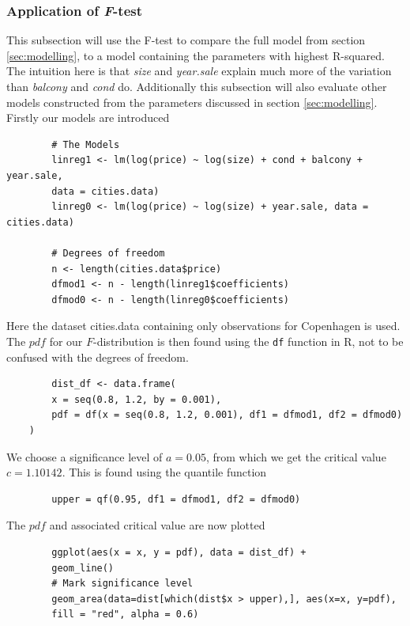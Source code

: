 \subsubsection{Application of \textit{F}-test}\label{sec:app_F_test}
    This subsection will use the F-test to compare the full model from section \ref{sec:modelling}, to a model containing the parameters with highest R-squared. 
    The intuition here is that \textit{size} and \textit{year.sale} explain much more of the variation than \textit{balcony} and \textit{cond} do.
    Additionally this subsection will also evaluate other models constructed from the parameters discussed in section \ref{sec:modelling}.
    Firstly our models are introduced
    \begin{lstlisting}
        # The Models
        linreg1 <- lm(log(price) ~ log(size) + cond + balcony + year.sale, 
        data = cities.data)
        linreg0 <- lm(log(price) ~ log(size) + year.sale, data = cities.data)
        
        # Degrees of freedom
        n <- length(cities.data$price)
        dfmod1 <- n - length(linreg1$coefficients)
        dfmod0 <- n - length(linreg0$coefficients)
    \end{lstlisting}
    Here the dataset cities.data containing only observations for Copenhagen is used.
    The $pdf$ for our $F$-distribution is then found using the \texttt{df} function in R, not to be confused with the degrees of freedom. 
    
    \begin{lstlisting}
        dist_df <- data.frame(
        x = seq(0.8, 1.2, by = 0.001),
        pdf = df(x = seq(0.8, 1.2, 0.001), df1 = dfmod1, df2 = dfmod0)
    )
    \end{lstlisting}
    
    We choose a significance level of $a = 0.05$, from which we get the critical value $c=1.10142$. 
    This is found using the quantile function
    
    \begin{lstlisting}
        upper = qf(0.95, df1 = dfmod1, df2 = dfmod0)
    \end{lstlisting}
    
    The $pdf$ and associated critical value are now plotted
    
    \begin{lstlisting}
        ggplot(aes(x = x, y = pdf), data = dist_df) + 
        geom_line()
        # Mark significance level
        geom_area(data=dist[which(dist$x > upper),], aes(x=x, y=pdf), 
        fill = "red", alpha = 0.6)
    \end{lstlisting}
    
